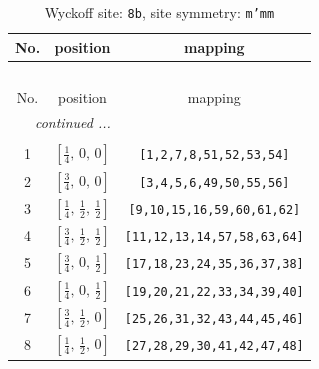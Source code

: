 \documentclass[fleqn,8pt]{jsarticle}
\begin{document}
\begin{longtable}{ccc}
\caption{Wyckoff site: {\tt 8b}, site symmetry: {\tt m'mm}}
 \\
 \hline \hline
No. & position & mapping \\ \hline \endfirsthead

\multicolumn{2}{l}{\tablename\ \thetable{}} \\
 \hline \hline
No. & position & mapping \\ \hline \endhead

 \hline \hline
\multicolumn{2}{r}{\footnotesize\it continued ...} \\ \endfoot

 \hline \hline
\multicolumn{2}{r}{} \\ \endlastfoot

1 & $\left[ \frac{1}{4},\, 0,\, 0 \right]$ & {\tt [1,2,7,8,51,52,53,54]} \\ \hline
2 & $\left[ \frac{3}{4},\, 0,\, 0 \right]$ & {\tt [3,4,5,6,49,50,55,56]} \\ \hline
3 & $\left[ \frac{1}{4},\, \frac{1}{2},\, \frac{1}{2} \right]$ & {\tt [9,10,15,16,59,60,61,62]} \\ \hline
4 & $\left[ \frac{3}{4},\, \frac{1}{2},\, \frac{1}{2} \right]$ & {\tt [11,12,13,14,57,58,63,64]} \\ \hline
5 & $\left[ \frac{3}{4},\, 0,\, \frac{1}{2} \right]$ & {\tt [17,18,23,24,35,36,37,38]} \\ \hline
6 & $\left[ \frac{1}{4},\, 0,\, \frac{1}{2} \right]$ & {\tt [19,20,21,22,33,34,39,40]} \\ \hline
7 & $\left[ \frac{3}{4},\, \frac{1}{2},\, 0 \right]$ & {\tt [25,26,31,32,43,44,45,46]} \\ \hline
8 & $\left[ \frac{1}{4},\, \frac{1}{2},\, 0 \right]$ & {\tt [27,28,29,30,41,42,47,48]} \\
\end{longtable}
\renewcommand{\arraystretch}{1.2}
\end{document}
